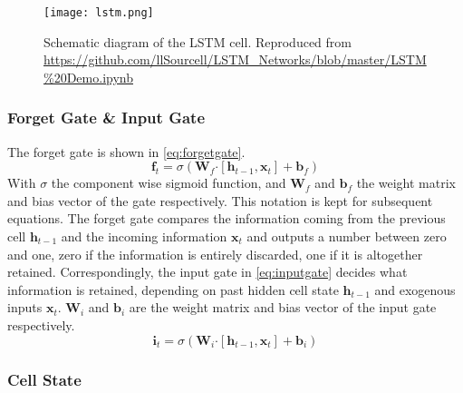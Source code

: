 \begin{figure}
	\noindent\texttt{[image: lstm.png]}
	\caption{Schematic diagram of the LSTM cell. Reproduced 
	from \url{https://github.com/llSourcell/LSTM_Networks/blob/master/LSTM\%20Demo.ipynb}}
	\label{fig:lstmcell}
\end{figure}

\subsubsection*{Forget Gate \& Input Gate}

The forget gate is shown in \cref{eq:forgetgate}.
%
\begin{equation}\label{eq:forgetgate}
 \mathbf{f}_{t} = \sigma  \left( \mathbf{W}_f \boldsymbol{\cdot}  \left[ \mathbf{h}_{t-1}, \mathbf{x}_t \right] + 
 \mathbf{b}_f \right)
\end{equation}
%
With $\sigma$ the component wise sigmoid function, and  $\mathbf{W}_{f}$ and $\mathbf{b}_{f}$ the weight matrix 
and bias vector of the gate respectively. This notation is kept for subsequent equations. The forget gate compares 
the information coming from the previous cell $\mathbf{h}_{t-1}$ and the incoming information $\mathbf{x}_{t}$ 
and outputs a number between zero and one, zero if the information is entirely discarded, one if it is 
altogether retained.
%
Correspondingly, the input gate in \cref{eq:inputgate} decides what information is retained, depending 
on past hidden cell state $\mathbf{h}_{t-1}$ and exogenous inputs $\mathbf{x}_t$. $\mathbf{W}_{i} $ and  
$\mathbf{b}_{i}$ are the weight matrix and bias vector of the input gate respectively.
%
\begin{equation}\label{eq:inputgate}
 \mathbf{i}_{t} = \sigma  \left(\mathbf{W}_{i} \boldsymbol{\cdot} \left[ \mathbf{h}_{t-1}, \mathbf{x}_{t} \right] + 
 \mathbf{b}_{i} \right)
\end{equation}

\subsubsection*{Cell State}

